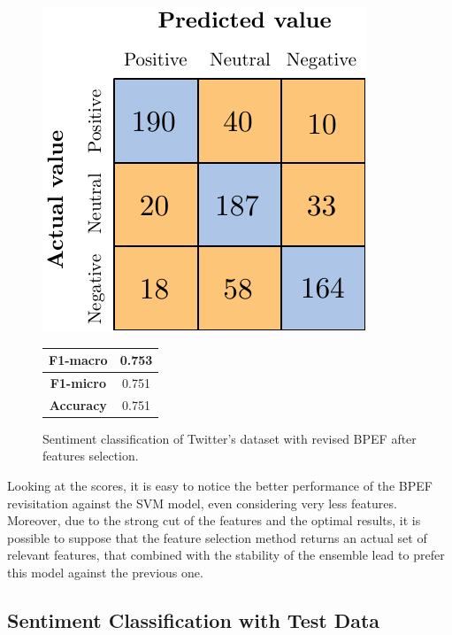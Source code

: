 \begin{figure}[H]
	\begin{minipage}[b]{0.6\linewidth}
		\centering
		\includegraphics[scale=1]{figures/conf_matrices/twitter_snt_bpef/twitter_snt_bpef_afs.pdf}
	\end{minipage}
	\begin{minipage}[b]{0.3\linewidth}
		\begin{tabular}[b]{ | c | c | } 
			\hline
			\textbf{F1-macro} & 0.753 \\
			\hline
			\textbf{F1-micro} & 0.751 \\ 
			\hline
			\textbf{Accuracy} & 0.751 \\ 
			\hline
		\end{tabular}
	\end{minipage}
	\caption{Sentiment classification of Twitter's dataset with revised BPEF after features selection.}
	\label{fig:tw_snt_bpef_afs}
\end{figure}

Looking at the scores, it is easy to notice the better performance of the BPEF revisitation against the SVM model, even considering very less features. Moreover, due to the strong cut of the features and the optimal results, it is possible to suppose that the feature selection method returns an actual set of relevant features, that combined with the stability of the ensemble lead to prefer this model against the previous one.


\subsection{Sentiment Classification with Test Data}

